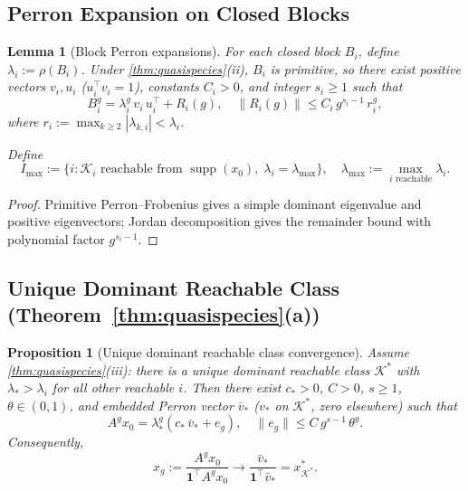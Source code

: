 \documentclass[12pt]{article}
\newtheorem{lemma}[theorem]{Lemma}
\newtheorem{proposition}[theorem]{Proposition}
\newcommand{\supp}{\operatorname{supp}}
\begin{document}
\subsection{Perron Expansion on Closed Blocks}\label{app:perron-expansion}

\begin{lemma}[Block Perron expansions]\label{lem:perron-expansion}
For each closed block $B_i$, define $\lambda_i := \rho(B_i)$. Under \cref{thm:quasispecies}(ii), $B_i$ is primitive, so there exist positive vectors $v_i, u_i$ ($u_i^\top v_i = 1$), constants $C_i > 0$, and integer $s_i \ge 1$ such that
\begin{equation}\label{eq:perron-expansion}
B_i^g = \lambda_i^g\, v_i\, u_i^\top + R_i(g), \quad \|R_i(g)\| \le C_i\, g^{s_i - 1}\, r_i^g,
\end{equation}
where $r_i := \max_{k \ge 2} |\lambda_{k,i}| < \lambda_i$.

Define
\begin{equation}
I_{\max} := \{i : \mathcal{K}_i \text{ reachable from } \supp(x_0),\; \lambda_i = \lambda_{\max}\}, \quad
\lambda_{\max} := \max_{i \text{ reachable}} \lambda_i.
\end{equation}
\end{lemma}

\begin{proof}
Primitive Perron--Frobenius gives a simple dominant eigenvalue and positive eigenvectors; Jordan decomposition gives the remainder bound with polynomial factor $g^{s_i - 1}$.
\end{proof}

\subsection{Unique Dominant Reachable Class (Theorem~\ref*{thm:quasispecies}(a))}\label{app:unique-dominant}

\begin{proposition}[Unique dominant reachable class convergence]\label{prop:dominant}
Assume \cref{thm:quasispecies}(iii): there is a unique dominant reachable class $\mathcal{K}^*$ with $\lambda_* > \lambda_i$ for all other reachable $i$. Then there exist $c_* > 0$, $C > 0$, $s \ge 1$, $\theta \in (0,1)$, and embedded Perron vector $\bar{v}_*$ ($v_*$ on $\mathcal{K}^*$, zero elsewhere) such that
\begin{equation}\label{eq:dominant-expansion}
A^g x_0 = \lambda_*^g (c_*\, \bar{v}_* + e_g), \quad \|e_g\| \le C\, g^{s-1}\, \theta^g.
\end{equation}
Consequently,
\begin{equation}
x_g := \frac{A^g x_0}{\mathbf{1}^\top A^g x_0} \to \frac{\bar{v}_*}{\mathbf{1}^\top \bar{v}_*} = x^*_{\mathcal{K}^*}.
\end{equation}
\end{proposition}
\end{document}
